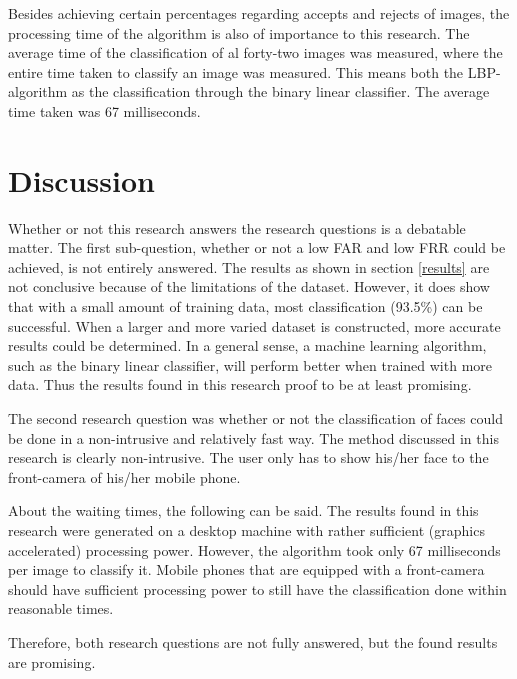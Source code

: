 \documentclass{sig-alternate-br}
\begin{document}
Besides achieving certain percentages regarding accepts and rejects of images, the processing time of the algorithm is also of importance to this research. The average time of the classification of al forty-two images was measured, where the entire time taken to classify an image was measured. This means both the LBP-algorithm as the classification through the binary linear classifier. The average time taken was 67 milliseconds.

\section{Discussion} \label{discussion}
Whether or not this research answers the research questions is a debatable matter. The first sub-question, whether or not a low FAR and low FRR could be achieved, is not entirely answered. The results as shown in section \ref{results} are not conclusive because of the limitations of the dataset. However, it does show that with a small amount of training data, most classification (93.5\%) can be successful. When a larger and more varied dataset is constructed, more accurate results could be determined. In a general sense, a machine learning algorithm, such as the binary linear classifier, will perform better when trained with more data. Thus the results found in this research proof to be at least promising.

The second research question was whether or not the classification of faces could be done in a non-intrusive and relatively fast way. The method discussed in this research is clearly non-intrusive. The user only has to show his/her face to the front-camera of his/her mobile phone.

About the waiting times, the following can be said. The results found in this research were generated on a desktop machine with rather sufficient (graphics accelerated) processing power. However, the algorithm took only 67 milliseconds per image to classify it. Mobile phones that are equipped with a front-camera should have sufficient processing power to still have the classification done within reasonable times.

Therefore, both research questions are not fully answered, but the found results are promising.




\balancecolumns
\end{document}
